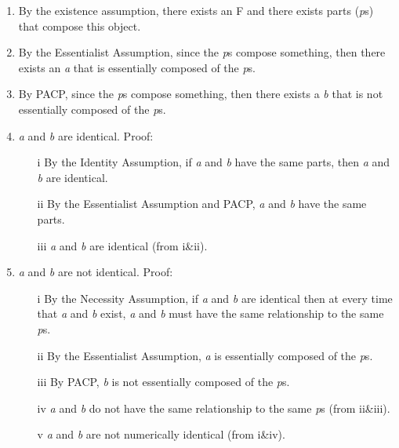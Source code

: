 \documentclass[9pt]{article}
\begin{document}
\begin{enumerate}
\item By the existence assumption, there exists an F and there exists parts (\emph{p}s) that compose this object. 
\item By the Essentialist Assumption, since the \emph{p}s compose something, then there exists an \emph{a} that is essentially composed of the \emph{p}s. 
\item By PACP, since the \emph{p}s compose something, then there exists a \emph{b}  that is not essentially composed of the \emph{p}s. 
\item \emph{a} and \emph{b} are identical. Proof: 
\begin{enumerate}
\item[i] By the Identity Assumption, if \emph{a} and \emph{b} have the same parts, then \emph{a} and \emph{b} are identical. 
\item[ii] By the Essentialist Assumption and PACP, \emph{a} and \emph{b} have the same parts. 
\item[iii] \emph{a} and \emph{b} are identical (from i\&ii).
\end{enumerate}
\item \emph{a} and \emph{b} are not identical. Proof: 
\begin{enumerate} 
\item[i] By the Necessity Assumption, if \emph{a} and \emph{b} are identical then at every time that \emph{a} and \emph{b} exist, \emph{a} and \emph{b} must have the same relationship to the same \emph{p}s. 
\item[ii] By the Essentialist Assumption, \emph{a} is essentially composed of the \emph{p}s. 
\item[iii] By PACP, \emph{b} is not essentially composed of the \emph{p}s. 
\item[iv] \emph{a} and \emph{b} do not have the same relationship to the same \emph{p}s (from ii\&iii).
\item[v] \emph{a} and \emph{b} are not numerically identical (from i\&iv).
\end{enumerate}
\end{enumerate}
\end{document}
